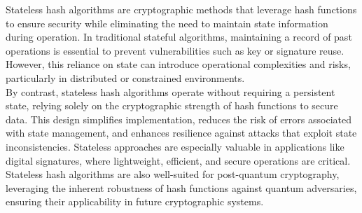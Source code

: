 \documentclass[journal=tosc,notanonymous]{iacrtrans}
\begin{document}
Stateless hash algorithms are cryptographic methods that leverage hash functions to ensure security while eliminating the need to maintain state information during operation. In traditional stateful algorithms, maintaining a record of past operations is essential to prevent vulnerabilities such as key or signature reuse. However, this reliance on state can introduce operational complexities and risks, particularly in distributed or constrained environments.
\\
By contrast, stateless hash algorithms operate without requiring a persistent state, relying solely on the cryptographic strength of hash functions to secure data. This design simplifies implementation, reduces the risk of errors associated with state management, and enhances resilience against attacks that exploit state inconsistencies. Stateless approaches are especially valuable in applications like digital signatures, where lightweight, efficient, and secure operations are critical.
\\
Stateless hash algorithms are also well-suited for post-quantum cryptography, leveraging the inherent robustness of hash functions against quantum adversaries, ensuring their applicability in future cryptographic systems.
\end{document}
